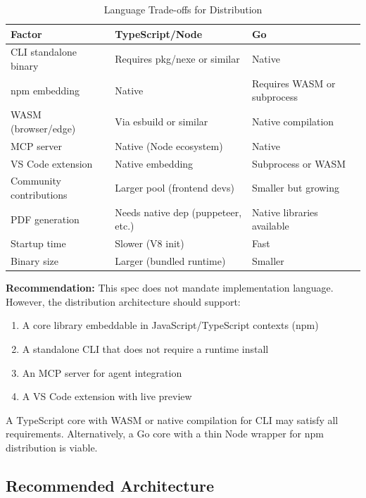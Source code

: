 \begin{table}[h]
\centering
\caption{Language Trade-offs for Distribution}
\begin{tabularx}{\textwidth}{lXX}
\toprule
\textbf{Factor} & \textbf{TypeScript/Node} & \textbf{Go} \\
\midrule
CLI standalone binary & Requires pkg/nexe or similar & Native \\
npm embedding & Native & Requires WASM or subprocess \\
WASM (browser/edge) & Via esbuild or similar & Native compilation \\
MCP server & Native (Node ecosystem) & Native \\
VS Code extension & Native embedding & Subprocess or WASM \\
Community contributions & Larger pool (frontend devs) & Smaller but growing \\
PDF generation & Needs native dep (puppeteer, etc.) & Native libraries available \\
Startup time & Slower (V8 init) & Fast \\
Binary size & Larger (bundled runtime) & Smaller \\
\bottomrule
\end{tabularx}
\end{table}

\textbf{Recommendation:} This spec does not mandate implementation language. However, the distribution architecture should support:
\begin{enumerate}
  \item A core library embeddable in JavaScript/TypeScript contexts (npm)
  \item A standalone CLI that does not require a runtime install
  \item An MCP server for agent integration
  \item A VS Code extension with live preview
\end{enumerate}

A TypeScript core with WASM or native compilation for CLI may satisfy all requirements. Alternatively, a Go core with a thin Node wrapper for npm distribution is viable.

\subsection{Recommended Architecture}


